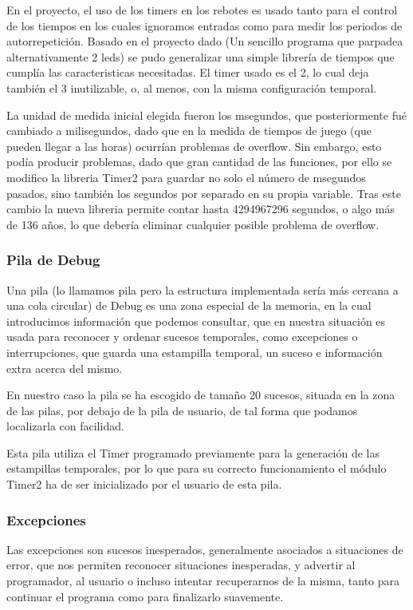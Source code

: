 \documentclass[12pt,letterpaper]{article}
\begin{document}
En el proyecto, el uso de los timers en los rebotes es usado tanto
para el control de los tiempos en los cuales ignoramos entradas como
para medir los periodos de autorrepetición. Basado en el proyecto dado
(Un sencillo programa que parpadea alternativamente 2 leds) se pudo
generalizar una simple librería de tiempos que cumplía las
caracteristicas necesitadas. El timer usado es el 2, lo cual deja
también el 3 inutilizable, o, al menos, con la misma configuración
temporal.

La unidad de medida inicial elegida fueron los \textgreek{m}segundos,
que posteriormente fué cambiado a milisegundos, dado que en la medida
de tiempos de juego (que pueden llegar a las horas) ocurrían problemas
de overflow. Sin embargo, esto podía producir problemas, dado que gran
cantidad de las funciones, por ello se modifico la libreria Timer2
para guardar no solo el número de \textgreek{m}segundos pasados, sino
también los segundos por separado en su propia variable. Tras este
cambio la nueva libreria permite contar hasta 4294967296 segundos, o
algo más de 136 años, lo que debería eliminar cualquier posible
problema de overflow.

\subsubsection{Pila de Debug}
\label{subsubsec:pila-debug}
Una pila (lo llamamos pila pero la estructura implementada sería más
cercana a una cola circular) de Debug es una zona especial de la
memoria, en la cual introducimos información que podemos consultar,
que en nuestra situación es usada para reconocer y ordenar sucesos
temporales, como excepciones o interrupciones, que guarda una
estampilla temporal, un suceso e información extra acerca del mismo.

En nuestro caso la pila se ha escogido de tamaño 20 sucesos, situada
en la zona de las pilas, por debajo de la pila de usuario, de tal
forma que podamos localizarla con facilidad.

Esta pila utiliza el Timer programado previamente para la generación
de las estampillas temporales, por lo que para su correcto
funcionamiento el módulo Timer2 ha de ser inicializado por el usuario
de esta pila.

\subsubsection{Excepciones}
\label{subsubsec:excepciones}
Las excepciones son sucesos inesperados, generalmente asociados a
situaciones de error, que nos permiten reconocer situaciones
inesperadas, y advertir al programador, al usuario o incluso intentar
recuperarnos de la misma, tanto para continuar el programa como para
finalizarlo suavemente.
\end{document}
